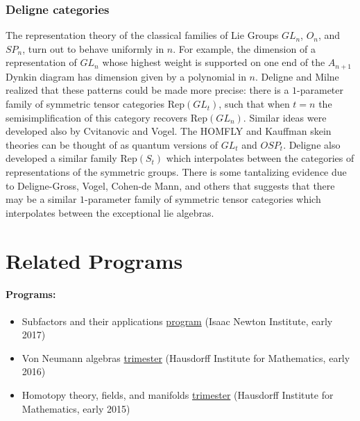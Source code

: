 \documentclass[11pt]{article}
\begin{document}
\subsubsection{Deligne categories}
The representation theory of the classical families of Lie Groups $GL_n$, $O_n$, and $SP_n$, turn out to behave uniformly in $n$. For example, the dimension of a representation of $GL_n$ whose highest weight is supported on one end of the $A_{n+1}$ Dynkin diagram has dimension given by a polynomial in $n$. Deligne and Milne realized that these patterns could be made more precise: there is a $1$-parameter family of symmetric tensor categories $\mathrm{Rep}(GL_t)$, such that when $t=n$ the semisimplification of this category recovers $\mathrm{Rep}(GL_n)$. Similar ideas were developed also by Cvitanovic and Vogel. The HOMFLY and Kauffman skein theories can be thought of as quantum versions of $GL_t$ and $OSP_t$.  Deligne also developed a similar family $\mathrm{Rep}(S_t)$ which interpolates between the categories of representations of the symmetric groups. There is some tantalizing evidence due to Deligne-Gross, Vogel, Cohen-de Mann, and others that suggests that there may be a similar $1$-parameter family of symmetric tensor categories which interpolates between the exceptional lie algebras.

\section{Related Programs}




\paragraph{Programs:}
\begin{itemize}
  \setlength{\itemsep}{1pt}
  \setlength{\parskip}{0pt}
  \setlength{\parsep}{0pt}
\item Subfactors and their applications \href{https://www.newton.ac.uk/event/oas}{program} (Isaac Newton Institute, early 2017)
\item Von Neumann algebras \href{https://www.him.uni-bonn.de/programs/future-programs/future-trimester-programs/von-neumann-algebras-2016/description/}{trimester} (Hausdorff Institute for Mathematics, early 2016)
\item Homotopy theory, fields, and manifolds \href{https://www.him.uni-bonn.de/programs/past-programs/past-trimester-programs/homotopy-theory-2015/description/}{trimester} (Hausdorff Institute for Mathematics, early 2015)
\end{itemize}
\end{document}
